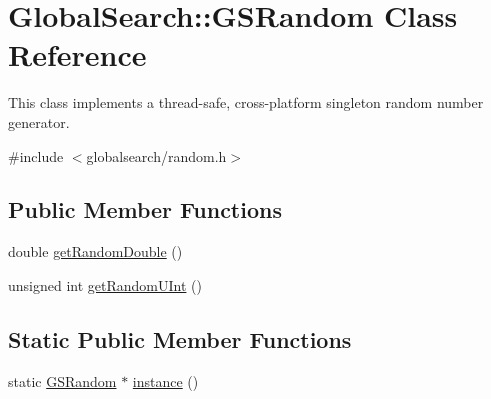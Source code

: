 \hypertarget{classGlobalSearch_1_1GSRandom}{\section{Global\-Search\-:\-:G\-S\-Random Class Reference}
\label{classGlobalSearch_1_1GSRandom}
}


This class implements a thread-\/safe, cross-\/platform singleton random number generator.  




{\ttfamily \#include $<$globalsearch/random.\-h$>$}

\subsection*{Public Member Functions}
\begin{DoxyCompactItemize}
\item 
double \hyperlink{classGlobalSearch_1_1GSRandom_ae648223ac2769459d66f446ac862955e}{get\-Random\-Double} ()
\item 
unsigned int \hyperlink{classGlobalSearch_1_1GSRandom_a225a2c9598d7d6636afecacdd7750228}{get\-Random\-U\-Int} ()
\end{DoxyCompactItemize}
\subsection*{Static Public Member Functions}
\begin{DoxyCompactItemize}
\item 
static \hyperlink{classGlobalSearch_1_1GSRandom}{G\-S\-Random} $\ast$ \hyperlink{classGlobalSearch_1_1GSRandom_a19c0a95c0f92f3ffedfbcb4e4f15a782}{instance} ()
\end{DoxyCompactItemize}
